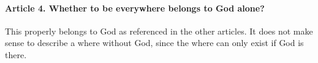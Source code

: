 \documentclass{ucetd}
\begin{document}
\paragraph{Article 4. Whether to be everywhere belongs to God alone?}
This properly belongs to God as referenced in the other articles. It does not make sense to describe a where without God, since the where can only exist if God is there.
\end{document}
